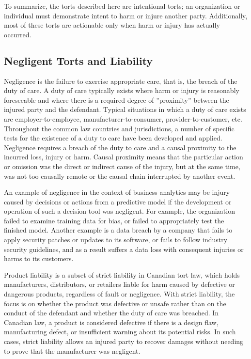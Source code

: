To summarize, the torts described here are intentional torts; an organization or individual must demonstrate intent to harm or injure another party. Additionally, most of these torts are actionable only when harm or injury has actually occurred. 

\subsection*{Negligent Torts and Liability}

Negligence is the failure to exercise appropriate care, that is, the breach of the duty of care. A duty of care typically exists where harm or injury is reasonably foreseeable and where there is a required degree of ''proximity'' between the injured party and the defendant. Typical situations in which a duty of care exists are employer-to-employee, manufacturer-to-consumer, provider-to-customer, etc. Throughout the common law countries and jurisdictions, a number of specific tests for the existence of a duty to care have been developed and applied. Negligence requires a breach of the duty to care and a causal proximity to the incurred loss, injury or harm. Causal proximity means that the particular action or omission was the direct or indirect cause of the injury, but at the same time, was not too causally remote or the causal chain interrupted by another event.

An example of negligence in the context of business analytics may be injury caused by decisions or actions from a predictive model if the development or operation of such a decision tool was negligent. For example, the organization failed to examine training data for bias, or failed to appropriately test the finished model. Another example is a data breach by a company that fails to apply security patches or updates to its software, or fails to follow industry security guidelines, and as a result suffers a data loss with consequent injuries or harms to its customers.

Product liability is a subset of strict liability in Canadian tort law, which holds manufacturers, distributors, or retailers liable for harm caused by defective or dangerous products, regardless of fault or negligence. With strict liability, the focus is on whether the product was defective or unsafe rather than on the conduct of the defendant and whether the duty of care was breached. In Canadian law, a product is considered defective if there is a design flaw, manufacturing defect, or insufficient warning about its potential risks. In such cases, strict liability allows an injured party to recover damages without needing to prove that the manufacturer was negligent.

